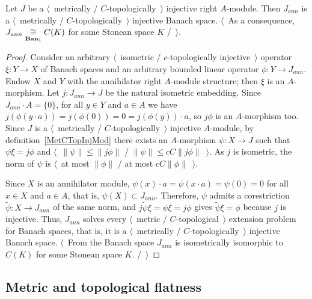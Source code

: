 \begin{proposition}\label{MetTopInjModAnnihPartIsInjBanSp} Let $J$ be a
$\langle$~metrically / $C$-topologically~$\rangle$ injective right $A$-module.
Then $J_{ann}$ is a $\langle$~metrically / $C$-topologically~$\rangle$ injective
Banach space. $\langle$~As a consequence,
$J_{ann}\mathrel{\mathop{\cong}\limits_{\mathbf{Ban}_1}}C(K)$ for some Stonean space $K$ /~$\rangle$.
\end{proposition}
\begin{proof} Consider an arbitrary $\langle$~isometric /
$c$-topologically injective~$\rangle$ operator $\xi:Y\to X$ of Banach spaces
and an arbitrary bounded linear operator $\phi:Y\to J_{ann}$. Endow $X$ and $Y$
with the annihilator right $A$-module structure; then $\xi$ is an
$A$-morphism. Let $j:J_{ann}\to J$ be the natural isometric embedding. Since
$J_{ann}\cdot A= \{0 \}$, for all $y\in Y$ and $a\in A$ we
have $j(\phi(y\cdot a))=j(\phi(0))=0=j(\phi(y))\cdot a$, so $j\phi$ is an
$A$-morphism too. Since $J$ is a $\langle$~metrically /
$C$-topologically~$\rangle$ injective $A$-module, by
definition~\ref{MetCTopInjMod} there exists an $A$-morphism $\psi:X\to J$ such
that $\psi\xi=j\phi$ and $\langle$~$\lVert\psi\rVert\leq\lVert j\phi\rVert$ /
$\lVert\psi\rVert\leq cC\lVert j\phi\rVert$~$\rangle$. As $j$ is isometric, the
norm of $\psi$ is $\langle$~at most $\lVert\phi\rVert$ / at most
$cC\lVert\phi\rVert$~$\rangle$.

Since $X$ is an annihilator module, $\psi(x)\cdot a=\psi(x\cdot a)=\psi(0)=0$
for all $x\in X$ and $a\in A$, that is, $\psi(X)\subset J_{ann}$. Therefore,
$\psi$ admits a corestriction $\widetilde{\psi}:X\to J_{ann}$ of the same norm,
and $j\widetilde{\psi}\xi=\psi\xi=j\phi$ gives $\widetilde{\psi}\xi=\phi$
because $j$ is injective. Thus, $J_{ann}$ solves every $\langle$~metric /
$C$-topological~$\rangle$ extension problem for Banach spaces, that is, it is a
$\langle$~metrically / $C$-topologically~$\rangle$ injective Banach space.
$\langle$~From \cite[theorem 3.11.6]{LaceyIsomThOfClassicBanSp} the Banach
space $J_{ann}$ is isometrically isomorphic to $C(K)$ for some Stonean
space $K$. /~$\rangle$
\end{proof}


\subsection{
    Metric and topological flatness}\label{SubSectionMetricAndTopologicalFlatness}

